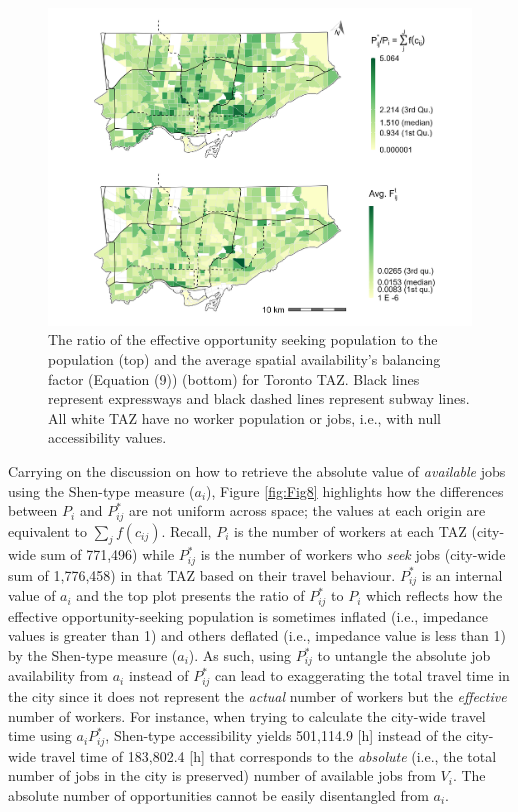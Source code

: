 \documentclass[10pt,letterpaper]{article}
\begin{document}
\begin{figure}
\includegraphics[width=1\linewidth]{images/Fig8} \caption{\label{fig:Fig8}  The ratio of the effective opportunity seeking population to the population (top) and the average spatial availability's balancing factor (Equation (9)) (bottom) for Toronto TAZ. Black lines represent expressways and black dashed lines represent subway lines. All white TAZ have no worker population or jobs, i.e., with null accessibility values.}\label{fig:internal-values-plot}
\end{figure}

Carrying on the discussion on how to retrieve the absolute value of
\emph{available} jobs using the Shen-type measure (\(a_i\)), Figure
\ref{fig:Fig8} highlights how the differences between \(P_i\) and
\(P_{ij}^*\) are not uniform across space; the values at each origin are
equivalent to \(\sum_j f(c_{ij})\). Recall, \(P_i\) is the number of
workers at each TAZ (city-wide sum of 771,496) while \(P_{ij}^*\) is the
number of workers who \emph{seek} jobs (city-wide sum of 1,776,458) in
that TAZ based on their travel behaviour. \(P_{ij}^*\) is an internal
value of \(a_i\) and the top plot presents the ratio of \(P_{ij}^*\) to
\(P_i\) which reflects how the effective opportunity-seeking population
is sometimes inflated (i.e., impedance values is greater than 1) and
others deflated (i.e., impedance value is less than 1) by the Shen-type
measure (\(a_i\)). As such, using \(P_{ij}^*\) to untangle the absolute
job availability from \(a_i\) instead of \(P_{ij}^*\) can lead to
exaggerating the total travel time in the city since it does not
represent the \emph{actual} number of workers but the \emph{effective}
number of workers. For instance, when trying to calculate the city-wide
travel time using \(a_i P_{ij}^*\), Shen-type accessibility yields
501,114.9 {[}h{]} instead of the city-wide travel time of 183,802.4
{[}h{]} that corresponds to the \emph{absolute} (i.e., the total number
of jobs in the city is preserved) number of available jobs from \(V_i\).
The absolute number of opportunities cannot be easily disentangled from
\(a_i\).
\end{document}
